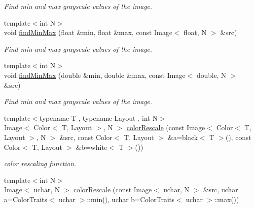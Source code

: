 \begin{DoxyCompactItemize}
\begin{DoxyCompactList}\small\item\em Find min and max grayscale values of the image. \end{DoxyCompactList}\item 
\hypertarget{group___image_ga0573e8647b615d0698ef000b5f013766}{{\footnotesize template$<$int N$>$ }\\void \hyperlink{group___image_ga0573e8647b615d0698ef000b5f013766}{find\-Min\-Max} (float \&min, float \&max, const Image$<$ float, N $>$ \&src)}\label{group___image_ga0573e8647b615d0698ef000b5f013766}

\begin{DoxyCompactList}\small\item\em Find min and max grayscale values of the image. \end{DoxyCompactList}\item 
\hypertarget{group___image_ga7b3472d8bf6ea05fb0c39ba0e380a924}{{\footnotesize template$<$int N$>$ }\\void \hyperlink{group___image_ga7b3472d8bf6ea05fb0c39ba0e380a924}{find\-Min\-Max} (double \&min, double \&max, const Image$<$ double, N $>$ \&src)}\label{group___image_ga7b3472d8bf6ea05fb0c39ba0e380a924}

\begin{DoxyCompactList}\small\item\em Find min and max grayscale values of the image. \end{DoxyCompactList}\item 
\hypertarget{group___image_gae3e29da826156e86b948cc0fda4d6e4d}{{\footnotesize template$<$typename T , typename Layout , int N$>$ }\\Image$<$ Color$<$ T, Layout $>$, N $>$ \hyperlink{group___image_gae3e29da826156e86b948cc0fda4d6e4d}{color\-Rescale} (const Image$<$ Color$<$ T, Layout $>$, N $>$ \&src, const Color$<$ T, Layout $>$ \&a=black$<$ T $>$(), const Color$<$ T, Layout $>$ \&b=white$<$ T $>$())}\label{group___image_gae3e29da826156e86b948cc0fda4d6e4d}

\begin{DoxyCompactList}\small\item\em color rescaling function. \end{DoxyCompactList}\item 
\hypertarget{group___image_gaac38b26a9b94db93dfd55b8842eab9ce}{{\footnotesize template$<$int N$>$ }\\Image$<$ uchar, N $>$ \hyperlink{group___image_gaac38b26a9b94db93dfd55b8842eab9ce}{color\-Rescale} (const Image$<$ uchar, N $>$ \&src, uchar a=Color\-Traits$<$ uchar $>$\-::min(), uchar b=Color\-Traits$<$ uchar $>$\-::max())}\label{group___image_gaac38b26a9b94db93dfd55b8842eab9ce}


\end{DoxyCompactItemize}
